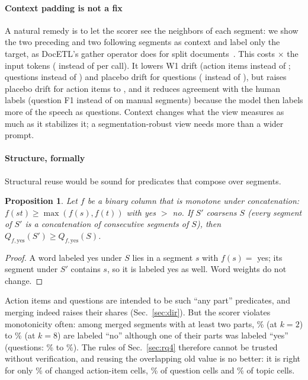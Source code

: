 \documentclass[conference]{IEEEtran}
\newtheorem{proposition}{Proposition}
\begin{document}
\paragraph*{Context padding is not a fix} A natural remedy is to let the scorer see the neighbors of each segment:
we show the two preceding and two following segments as context and label only the target, as DocETL's gather
operator does for split documents~\cite{docetl}. This costs
\nCtxRatio$\times$ the input tokens (\nCtxTokCtx{} instead of \nCtxTokPlain{} per call). It lowers W1 drift (action
items \nWoneQoneCtxmed{} instead of \nHonemed; questions \nWoneQtwoCtxmed{} instead of \nWoneQtwomed) and placebo drift
for questions (\nWtwoQtwoCtxmed{} instead of \nWtwoQtwomed), but raises placebo drift for action items to
\nWtwoQoneCtxmed{}, and it reduces agreement with the human labels (question F1 \nGoldQumanualfoneCtx{} instead of
\nGoldQumanualfone{} on manual segments) because the model then labels more of the speech as questions. Context
changes what the view measures as much as it stabilizes it; a segmentation-robust view needs more than a wider prompt.
\paragraph*{Structure, formally} Structural reuse would be sound for predicates that compose over segments.
\begin{proposition}\label{prop:mono} 
Let $f$ be a binary column that is monotone under concatenation: $f(st) \ge \max(f(s), f(t))$ with yes $>$ no. If
$S'$ coarsens $S$ (every segment of $S'$ is a concatenation of consecutive segments of $S$), then
$Q_{f,\mathrm{yes}}(S') \ge Q_{f,\mathrm{yes}}(S)$.
\end{proposition}
\begin{proof}
A word labeled yes under $S$ lies in a segment $s$ with $f(s)=$ yes; its segment under $S'$ contains $s$, so it is
labeled yes as well. Word weights do not change.
\end{proof}
Action items and questions are intended to be such ``any part'' predicates, and merging indeed raises their shares
(Sec.~\ref{sec:dir}). But the scorer violates monotonicity often: among merged segments with at least two parts,
\nMonoktwoAcloss\% (at $k=2$) to \nMonokeightAcloss\% (at $k=8$) are labeled ``no'' although one of their parts was
labeled ``yes'' (questions: \nMonoktwoQuloss\% to \nMonokeightQuloss\%). The rules of Sec.~\ref{sec:rq4} therefore
cannot be trusted without verification, and reusing the overlapping old value is no better: it is right for only
\nAnchorAccactionitem\% of changed action-item cells, \nAnchorAccquestion\% of question cells and
\nAnchorAcctopic\% of topic cells.
\end{document}
